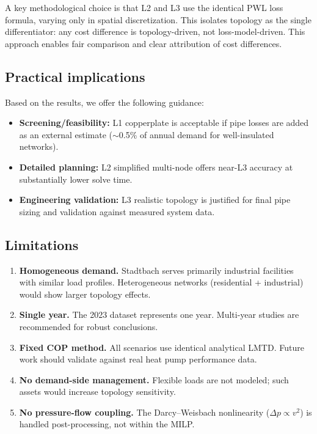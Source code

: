 \documentclass[a4paper,fleqn]{cas-dc}
\begin{document}
A key methodological choice is that L2 and L3 use the identical PWL loss formula, varying only in spatial discretization. This isolates topology as the single differentiator: any cost difference is topology-driven, not loss-model-driven. This approach enables fair comparison and clear attribution of cost differences.

\subsection{Practical implications}

Based on the results, we offer the following guidance:
\begin{itemize}
\item \textbf{Screening/feasibility:} L1 copperplate is acceptable if pipe losses are added as an external estimate ($\sim$0.5\% of annual demand for well-insulated networks).
\item \textbf{Detailed planning:} L2 simplified multi-node offers near-L3 accuracy at substantially lower solve time.
\item \textbf{Engineering validation:} L3 realistic topology is justified for final pipe sizing and validation against measured system data.
\end{itemize}

\subsection{Limitations}

\begin{enumerate}
\item \textbf{Homogeneous demand.} Stadtbach serves primarily industrial facilities with similar load profiles. Heterogeneous networks (residential + industrial) would show larger topology effects.
\item \textbf{Single year.} The 2023 dataset represents one year. Multi-year studies are recommended for robust conclusions.
\item \textbf{Fixed COP method.} All scenarios use identical analytical LMTD. Future work should validate against real heat pump performance data.
\item \textbf{No demand-side management.} Flexible loads are not modeled; such assets would increase topology sensitivity.
\item \textbf{No pressure-flow coupling.} The Darcy--Weisbach nonlinearity ($\Delta p \propto v^2$) is handled post-processing, not within the MILP.
\end{enumerate}
\end{document}
